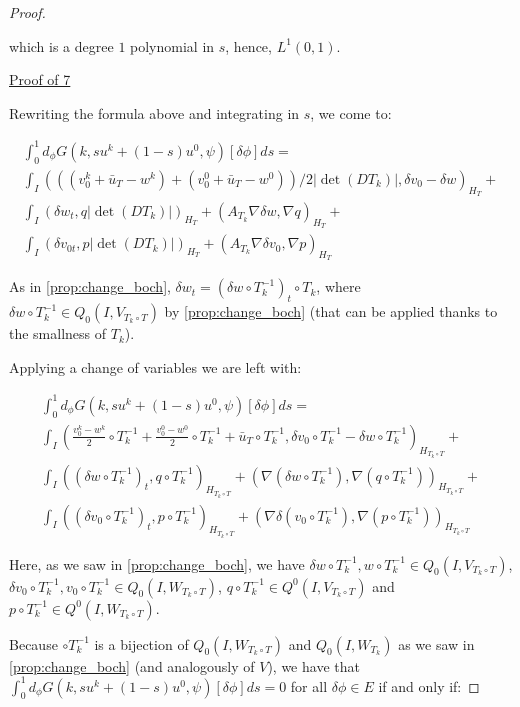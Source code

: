 \documentclass[english,a4paper,12pt,oneside]{scrbook}
\theoremstyle{break}
\newenvironment{mproof}[1][\proofname]{%
  \begin{proof}[#1]$ $\par\nobreak\ignorespaces
}{%
  \end{proof}
}
\renewcommand*{\proofname}{Proof}
\theoremstyle{remark}
\begin{document}
\begin{mproof}
which is a degree $1$ polynomial in $s$, hence, $L^1(0,1)$.

\underline{Proof of 7}

Rewriting the formula above and integrating in $s$, we come to:

\begin{align*}
\int_0^1d_\phi G(k, su^k + (1-s)u^0,\psi)[\delta \phi]ds = \\
\int_I (((v_0^k+\bar{u}_T - w^k)+(v_0^0+\bar{u}_T - w^0))/2|\det(DT_k)|,\delta v_0-\delta w)_{H_T}+\\
\int_I ( \delta w_t , q |\det(DT_k)|)_{H_T}+ (A_{T_k}\nabla \delta w, \nabla q)_{H_T}+\\
\int_I ( \delta v_{0t},p |\det(DT_k)|)_{H_T} + (A_{T_k} \nabla \delta v_0, \nabla p)_{H_T}
\end{align*}

As in \cref{prop:change_boch}, $ \delta w_t  = (\delta w\circ T_k^{-1})_t\circ T_k$, where $\delta w\circ T_k^{-1} \in Q_0(I,V_{T_k \circ T})$ by \cref{prop:change_boch} (that can be applied thanks to the smallness of $T_k$).

Applying a change of variables we are left with:

\begin{align*}
\int_0^1 d_\phi G(k, su^k + (1-s)u^0,\psi)[\delta \phi]ds = \\
\int_I \left (\frac{v_0^k-w^k}{2}\circ T_k^{-1}+ \frac{v_0^0-w^0}{2}\circ T_k^{-1}+\bar{u}_T\circ T_k^{-1} ,\delta v_0\circ T_k^{-1}-\delta w\circ T_k^{-1}\right)_{H_{T_k \circ T}}+\\
\int_I ((\delta w\circ T_k^{-1})_t , q\circ T_k^{-1} )_{H_{T_k \circ T}}+ (\nabla (\delta w\circ T_k^{-1}), \nabla( q\circ T_k^{-1}))_{H_{T_k \circ T}}+\\
\int_I ( (\delta v_{0}\circ T_k^{-1})_t,p \circ T_k^{-1})_{H_{T_k \circ T}} + ( \nabla \delta (v_0\circ T_k^{-1}), \nabla (p\circ T_k^{-1}))_{H_{T_k \circ T}}
\end{align*}

Here, as we saw in \cref{prop:change_boch}, we have $\delta w\circ T_k^{-1}, w\circ T_k^{-1} \in Q_0(I, V_{T_k \circ T})$, $ \delta v_{0}\circ T_k^{-1}, v_{0}\circ T_k^{-1} \in Q_0(I,W_{T_k \circ T})$, $q\circ T_k^{-1}\in Q^0(I, V_{T_k \circ T})$ and $p\circ T_k^{-1}\in Q^0(I, W_{T_k \circ T})$.

Because $\circ T_k^{-1}$ is a bijection of $Q_0(I,W_{T_k \circ T})$ and $Q_0(I,W_{T_k})$ as we saw in \ref{prop:change_boch} (and analogously of $V$), we have that  $\int_0^1 d_\phi G(k, su^k + (1-s)u^0,\psi)[\delta \phi]ds=0$ for all $\delta \phi \in E$ if and only if:


\end{mproof}
\end{document}

